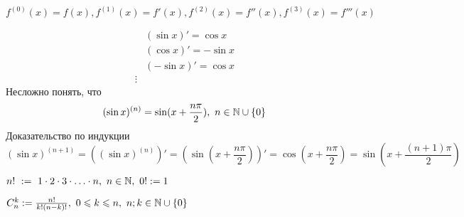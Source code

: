 \begin{note}
	$f^{(0)}(x) = f(x), f^{(1)}(x) = f'(x), f^{(2)}(x) = f''(x), f^{(3)}(x) = f'''(x)$
\end{note}

\begin{example}
	\begin{align*}
		&{(\sin x)' = \cos x}
		\\
		&{(\cos x)' = -\sin x}
		\\
		&{(-\sin x)' = \cos x}
		\\
		\vdots
	\end{align*}
	Несложно понять, что
	\[
	(\sin x)^{(n)} = \sin (x + \frac{n\pi}{2}),\ n \in \mathbb{N} \cup \{0\}
	\]
	Доказательство по индукции
	\[
	(\sin x)^{(n + 1)} = \left((\sin x)^{(n)}\right)' = \left(\sin(x + \frac{n\pi}{2})\right)' = \cos(x + \frac{n\pi}{2}) = \sin\left(x + \frac{(n + 1)\pi}{2}\right)
	\]
\end{example}

\begin{definition}
	$n!\ :=\ 1 \cdot 2 \cdot 3 \cdot
	\ldots \cdot n,\ n \in \mathbb{N},\ 0! := 1$
\end{definition}

\begin{definition}
	$C_n^k := \frac{n!}{k!(n - k)!},\ 
	0 \le k \le n,\ n; k \in \N \cup \{0\}$
\end{definition}